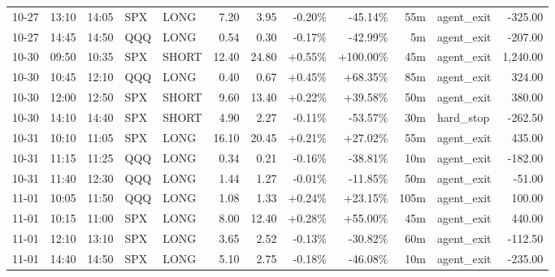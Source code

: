 \documentclass[11pt,a4paper,twoside]{article}
\begin{document}
\begin{center}
\begin{longtable}{>{\color{txtmain}}l l l l l r r r r r >{\color{txtmain}}l r}
10-27 & 13:10 & 14:05 & SPX & LONG & 7.20 & 3.95 & \textcolor{lossred}{-0.20\%} & \textcolor{lossred}{-45.14\%} & 55m & agent\_exit & \textcolor{lossred}{-325.00} \\
10-27 & 14:45 & 14:50 & QQQ & LONG & 0.54 & 0.30 & \textcolor{lossred}{-0.17\%} & \textcolor{lossred}{-42.99\%} & 5m & agent\_exit & \textcolor{lossred}{-207.00} \\
10-30 & 09:50 & 10:35 & SPX & SHORT & 12.40 & 24.80 & \textcolor{wingreen}{+0.55\%} & \textcolor{wingreen}{+100.00\%} & 45m & agent\_exit & \textcolor{wingreen}{1,240.00} \\
10-30 & 10:45 & 12:10 & QQQ & LONG & 0.40 & 0.67 & \textcolor{wingreen}{+0.45\%} & \textcolor{wingreen}{+68.35\%} & 85m & agent\_exit & \textcolor{wingreen}{324.00} \\
10-30 & 12:00 & 12:50 & SPX & SHORT & 9.60 & 13.40 & \textcolor{wingreen}{+0.22\%} & \textcolor{wingreen}{+39.58\%} & 50m & agent\_exit & \textcolor{wingreen}{380.00} \\
10-30 & 14:10 & 14:40 & SPX & SHORT & 4.90 & 2.27 & \textcolor{lossred}{-0.11\%} & \textcolor{lossred}{-53.57\%} & 30m & hard\_stop & \textcolor{lossred}{-262.50} \\
10-31 & 10:10 & 11:05 & SPX & LONG & 16.10 & 20.45 & \textcolor{wingreen}{+0.21\%} & \textcolor{wingreen}{+27.02\%} & 55m & agent\_exit & \textcolor{wingreen}{435.00} \\
10-31 & 11:15 & 11:25 & QQQ & LONG & 0.34 & 0.21 & \textcolor{lossred}{-0.16\%} & \textcolor{lossred}{-38.81\%} & 10m & agent\_exit & \textcolor{lossred}{-182.00} \\
10-31 & 11:40 & 12:30 & QQQ & LONG & 1.44 & 1.27 & \textcolor{lossred}{-0.01\%} & \textcolor{lossred}{-11.85\%} & 50m & agent\_exit & \textcolor{lossred}{-51.00} \\
11-01 & 10:05 & 11:50 & QQQ & LONG & 1.08 & 1.33 & \textcolor{wingreen}{+0.24\%} & \textcolor{wingreen}{+23.15\%} & 105m & agent\_exit & \textcolor{wingreen}{100.00} \\
11-01 & 10:15 & 11:00 & SPX & LONG & 8.00 & 12.40 & \textcolor{wingreen}{+0.28\%} & \textcolor{wingreen}{+55.00\%} & 45m & agent\_exit & \textcolor{wingreen}{440.00} \\
11-01 & 12:10 & 13:10 & SPX & LONG & 3.65 & 2.52 & \textcolor{lossred}{-0.13\%} & \textcolor{lossred}{-30.82\%} & 60m & agent\_exit & \textcolor{lossred}{-112.50} \\
11-01 & 14:40 & 14:50 & SPX & LONG & 5.10 & 2.75 & \textcolor{lossred}{-0.18\%} & \textcolor{lossred}{-46.08\%} & 10m & agent\_exit & \textcolor{lossred}{-235.00} \\

\end{longtable}
\end{center}
\end{document}
